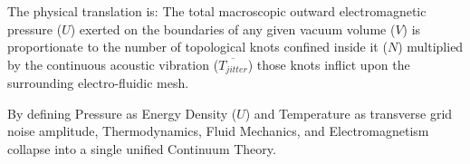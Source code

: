 The physical translation is: The total macroscopic outward electromagnetic pressure ($U$) exerted on the boundaries of any given vacuum volume ($V$) is proportionate to the number of topological knots confined inside it ($N$) multiplied by the continuous acoustic vibration ($\overline{T_{jitter}}$) those knots inflict upon the surrounding electro-fluidic mesh.

By defining Pressure as Energy Density ($U$) and Temperature as transverse grid noise amplitude, Thermodynamics, Fluid Mechanics, and Electromagnetism collapse into a single unified Continuum Theory.
